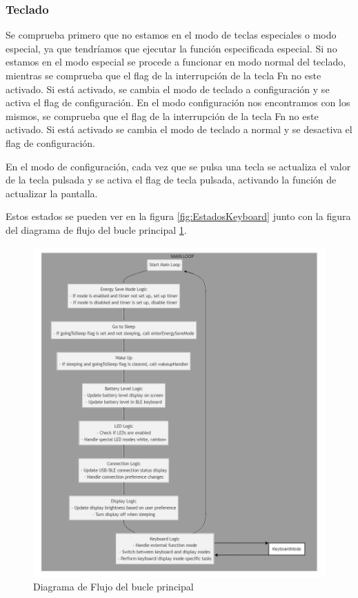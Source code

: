 \subsubsection{Teclado}
Se comprueba primero que no estamos en el modo de teclas especiales o modo especial, ya que tendríamos que ejecutar la función especificada especial.
Si no estamos en el modo especial se procede a funcionar en modo normal del teclado, mientras se comprueba que el flag de la interrupción de la tecla Fn no este activado. Si está activado, se cambia el modo de teclado a configuración y se activa el flag de configuración.
En el modo configuración nos encontramos con los mismos, se comprueba que el flag de la interrupción de la tecla Fn no este activado. Si está activado se cambia el modo de teclado a normal y se desactiva el flag de configuración.

En el modo de configuración, cada vez que se pulsa una tecla se actualiza el valor de la tecla pulsada y se activa el flag de tecla pulsada, activando la función de actualizar la pantalla.

Estos estados se pueden ver en la figura \ref{fig:EstadosKeyboard} junto con la figura del diagrama de flujo del bucle principal \ref{fig:MainLoop}.

\begin{figure}[H]
    \centering
    \includegraphics[width=1\textwidth]{imagenes/Capitulos/Cap07/MainLoop.png}
    \caption{Diagrama de Flujo del bucle principal}
    \label{fig:MainLoop}
\end{figure}

